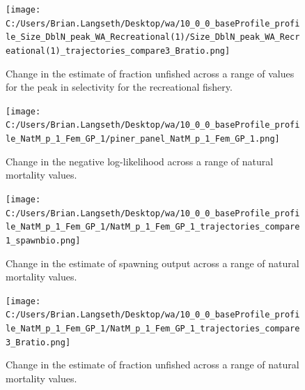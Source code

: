 \documentclass[11pt,
  english,
  letterpaper,
]{article}
\begin{document}
\tagmcend\tagstructend


\begin{figure}
\centering
\texttt{[image: C:/Users/Brian.Langseth/Desktop/wa/10\_0\_0\_baseProfile\_profile\_Size\_DblN\_peak\_WA\_Recreational(1)/Size\_DblN\_peak\_WA\_Recreational(1)\_trajectories\_compare3\_Bratio.png]}
\caption{Change in the estimate of fraction unfished across a range of values for the peak in selectivity for the recreational fishery.\label{fig:recselex-depl}}
\end{figure}

\tagmcend\tagstructend


\begin{figure}
\centering
\texttt{[image: C:/Users/Brian.Langseth/Desktop/wa/10\_0\_0\_baseProfile\_profile\_NatM\_p\_1\_Fem\_GP\_1/piner\_panel\_NatM\_p\_1\_Fem\_GP\_1.png]}
\caption{Change in the negative log-likelihood across a range of natural mortality values.\label{fig:m-profile}}
\end{figure}

\tagmcend\tagstructend


\begin{figure}
\centering
\texttt{[image: C:/Users/Brian.Langseth/Desktop/wa/10\_0\_0\_baseProfile\_profile\_NatM\_p\_1\_Fem\_GP\_1/NatM\_p\_1\_Fem\_GP\_1\_trajectories\_compare1\_spawnbio.png]}
\caption{Change in the estimate of spawning output across a range of natural mortality values.\label{fig:m-ssb}}
\end{figure}

\tagmcend\tagstructend


\begin{figure}
\centering
\texttt{[image: C:/Users/Brian.Langseth/Desktop/wa/10\_0\_0\_baseProfile\_profile\_NatM\_p\_1\_Fem\_GP\_1/NatM\_p\_1\_Fem\_GP\_1\_trajectories\_compare3\_Bratio.png]}
\caption{Change in the estimate of fraction unfished across a range of natural mortality values.\label{fig:m-depl}}
\end{figure}

\tagmcend\tagstructend

\end{document}

